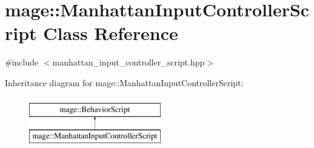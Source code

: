 \hypertarget{classmage_1_1_manhattan_input_controller_script}{}\section{mage\+:\+:Manhattan\+Input\+Controller\+Script Class Reference}
\label{classmage_1_1_manhattan_input_controller_script}


{\ttfamily \#include $<$manhattan\+\_\+input\+\_\+controller\+\_\+script.\+hpp$>$}

Inheritance diagram for mage\+:\+:Manhattan\+Input\+Controller\+Script\+:\begin{figure}[H]
\begin{center}
\leavevmode
\includegraphics[height=2.000000cm]{classmage_1_1_manhattan_input_controller_script}
\end{center}
\end{figure}
